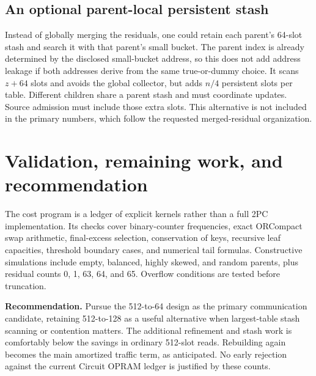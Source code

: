 \documentclass[11pt]{article}
\begin{document}
\subsection{An optional parent-local persistent stash}
Instead of globally merging the residuals, one could retain each parent's
64-slot stash and search it with that parent's small bucket. The parent
index is already determined by the disclosed small-bucket address, so this
does not add address leakage if both addresses derive from the same
true-or-dummy choice. It scans $z+64$ slots and avoids the global collector,
but adds $n/4$ persistent slots per table. Different children share a parent
stash and must coordinate updates. Source admission must include those
extra slots. This alternative is not included in the primary numbers,
which follow the requested merged-residual organization.

\section{Validation, remaining work, and recommendation}
The cost program is a ledger of explicit kernels rather than a full 2PC
implementation. Its checks cover binary-counter frequencies, exact
ORCompact swap arithmetic, final-excess selection, conservation of keys,
recursive leaf capacities, threshold boundary cases, and numerical tail
formulas. Constructive simulations include empty, balanced, highly skewed,
and random parents, plus residual counts 0, 1, 63, 64, and 65. Overflow
conditions are tested before truncation.

\textbf{Recommendation.} Pursue the 512-to-64 design as the primary
communication candidate, retaining 512-to-128 as a useful alternative
when largest-table stash scanning or contention matters. The additional
refinement and stash work is comfortably below the savings in ordinary
512-slot reads. Rebuilding again becomes the main amortized traffic term,
as anticipated. No early rejection against the current Circuit OPRAM
ledger is justified by these counts.
\end{document}
